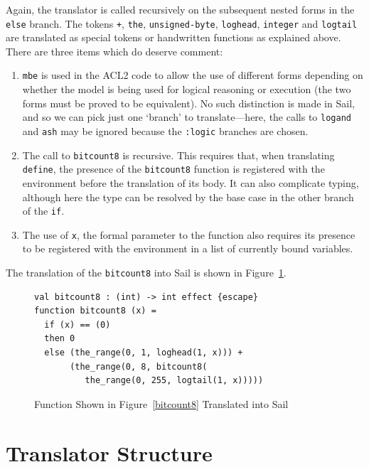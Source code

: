 \documentclass[a4paper,12pt,twoside,openright]{report}
\begin{document}
Again, the translator is called recursively on the subsequent nested forms in the \texttt{else} branch.  The tokens \texttt{+}, \texttt{the}, \texttt{unsigned-byte}, \texttt{loghead}, \texttt{integer} and \texttt{logtail} are translated as special tokens or handwritten functions as explained above.  There are three items which do deserve comment:

\begin{enumerate}
	\item \texttt{mbe} is used in the ACL2 code to allow the use of different forms depending on whether the model is being used for logical reasoning or execution (the two forms must be proved to be equivalent).  No such distinction is made in Sail, and so we can pick just one `branch' to translate---here, the calls to \texttt{logand} and \texttt{ash} may be ignored because the \texttt{:logic} branches are chosen.
	\item The call to \texttt{bitcount8} is recursive.  This requires that, when translating \texttt{define}, the presence of the \texttt{bitcount8} function is registered with the environment before the translation of its body.  It can also complicate typing, although here the type can be resolved by the base case in the other branch of the \texttt{if}.
	\item The use of \texttt{x}, the formal parameter to the function also requires its presence to be registered with the environment in a list of currently bound variables.
\end{enumerate}

The translation of the \texttt{bitcount8} into Sail is shown in Figure~\ref{bitcount8-sail}.

\begin{figure}
\begin{lstlisting}[language=sail]
val bitcount8 : (int) -> int effect {escape}
function bitcount8 (x) =
  if (x) == (0)
  then 0
  else (the_range(0, 1, loghead(1, x))) + 
       (the_range(0, 8, bitcount8(
          the_range(0, 255, logtail(1, x)))))
\end{lstlisting}
\caption{Function Shown in Figure~\ref{bitcount8} Translated into Sail}
\label{bitcount8-sail}
\end{figure}

\hypertarget{translator-structure}{
\section{Translator Structure}\label{translator-structure}}
\end{document}
